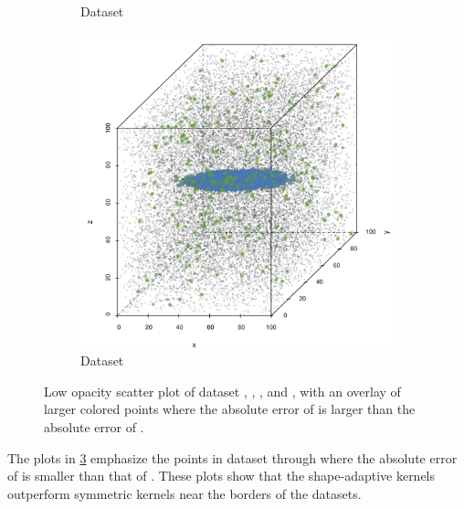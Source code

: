 \begin{figure}
\begin{subfigure}{0.23\textwidth}
				\caption{Dataset \baakmanFour}
				\label{fig:discussion:performance:mbeLowerError:baakman4}
			\end{subfigure}		
			\begin{subfigure}{0.23\textwidth}
				\centering
				\includegraphics[keepaspectratio=true, width=\textwidth, height=0.23\textheight]{discussion/img/baakman_5_abs_error_mbeSmallerThansambe}
				\caption{Dataset \baakmanFive}
				\label{fig:discussion:performance:mbeLowerError:baakman5}
			\end{subfigure}			
			\caption{Low opacity scatter plot of dataset %
				 \ferdosiOne, %
				 \baakmanOne, %
				 \baakmanFour, and%
				 \baakmanFive, %
				with an overlay of larger colored points where the absolute error of \sambe is larger than the absolute error of \mbe.}
			\label{fig:discussion:performance:singleSphere:mbeLowerError}
		\end{figure}
		The plots in \cref{fig:discussion:performance:singleSphere:mbeLowerError} emphasize the points in dataset \ferdosiOne through \baakmanOne where the absolute error of \mbe is smaller than that of \sambe. These plots show that the shape-adaptive kernels outperform symmetric kernels near the borders of the datasets.
